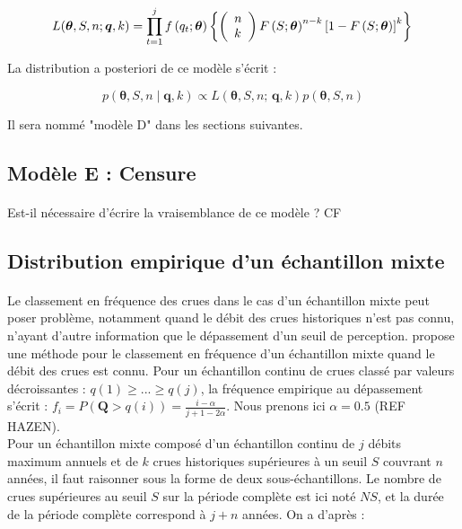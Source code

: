 \documentclass[11pt]{article}
\begin{document}
					\begin{equation}
			L(\boldsymbol{\theta}, S, n ; \boldsymbol{q}, k) = \prod_{t=1}^j f\left(q_t;\boldsymbol{\theta}\right) \left\{\left(\begin{array}{l}
			n \\
			k
			\end{array}\right) F\left(S;\boldsymbol{\theta}\right)^{n-k}\left[1-F\left(S;\boldsymbol{\theta}\right)\right]^k\right\} \\
			\label{eq:Gev_Binom_SN}
			\end{equation}
		
		La distribution a posteriori de ce modèle s'écrit :
					
			\begin{equation}
				p(\boldsymbol{\theta}, S, n \mid \boldsymbol{q},k) \propto L(\boldsymbol{\theta},S, n;\,\boldsymbol{q},k) p(\boldsymbol{\theta},S, n)
				\label{eq:Bayes_uSN}
			\end{equation}

	Il sera nommé "modèle D" dans les sections suivantes. 
	
	\subsection{Modèle E : Censure}
	\paragraph{} Est-il nécessaire d'écrire la vraisemblance de ce modèle ? CF \citet{stedinger_flood_1986}

	\subsection{Distribution empirique d'un échantillon mixte}
	
		\paragraph{} Le classement en fréquence des crues dans le cas d'un échantillon mixte peut poser problème, notamment quand le débit des crues historiques n'est pas connu, n'ayant d'autre information que le dépassement d'un seuil de perception. \citet{hirsch_probability_1987} propose une méthode pour le classement en fréquence d'un échantillon mixte quand le débit des crues est connu. Pour un échantillon continu de crues classé par valeurs décroissantes : $q(1) \geq ... \geq q(j)$, la fréquence empirique au dépassement s'écrit : $f_i = P(\boldsymbol{Q} > q(i)) = \frac{i-\alpha}{j+1-2\alpha}$. Nous prenons ici $\alpha = 0.5$ (REF HAZEN). \\
		Pour un échantillon mixte composé d'un échantillon continu de $j$ débits maximum annuels et de $k$ crues historiques supérieures à un seuil $S$ couvrant $n$ années, il faut raisonner sous la forme de deux sous-échantillons. Le nombre de crues supérieures au seuil $S$ sur la période complète est ici noté $NS$, et la durée de la période complète correspond à $j + n$ années. On a d'après \citet{hirsch_probability_1987} :
		
\end{document}
